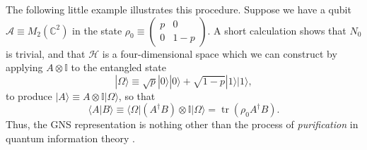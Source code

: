 \documentclass[11pt]{amsart}
\DeclareMathOperator{\tr}{tr}
\theoremstyle{plain}%
\theoremstyle{definition}
\theoremstyle{remark}
\begin{document}
The following little example illustrates this procedure. Suppose we have a qubit $\mathcal{A}\equiv M_2(\mathbb{C}^2)$ in the state $\rho_0 \equiv \left(\begin{smallmatrix}
p&0\\ 0&1-p
\end{smallmatrix}\right)$. A short calculation shows that $N_0$ is trivial, and that $\mathcal{H}$ is a four-dimensional space which we can construct by applying $A\otimes \mathbb{I}$ to the entangled state
\begin{equation}
	|\Omega\rangle \equiv \sqrt{p}|0\rangle|0\rangle + \sqrt{1-p}|1\rangle|1\rangle,
\end{equation}
to produce $|A\rangle \equiv A\otimes\mathbb{I}|\Omega\rangle$, so that  
\begin{equation}
	\langle A|B\rangle \equiv \langle\Omega|(A^\dag B) \otimes \mathbb{I}|\Omega\rangle = \tr(\rho_0 A^\dag B).
\end{equation}
Thus, the GNS representation is nothing other than the process of \emph{purification} in quantum information theory \cite{nielsen_quantum_2000}.
\end{document}
